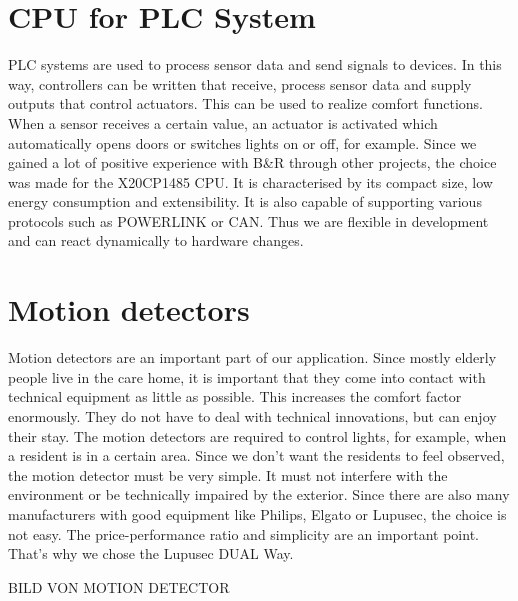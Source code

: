 \section{CPU for PLC System}
PLC systems are used to process sensor data and send signals to devices. In this way, controllers can be written that receive, process sensor data and supply outputs that control actuators. This can be used to realize comfort functions. When a sensor receives a certain value, an actuator is activated which automatically opens doors or switches lights on or off, for example. Since we gained a lot of positive experience with B\&R through other projects, the choice was made for the X20CP1485 CPU. It is characterised by its compact size, low energy consumption and extensibility. It is also capable of supporting various protocols such as POWERLINK or CAN. Thus we are flexible in development and can react dynamically to hardware changes.

\section{Motion detectors}
Motion detectors are an important part of our application. Since mostly elderly people live in the care home, it is important that they come into contact with technical equipment as little as possible. This increases the comfort factor enormously. They do not have to deal with technical innovations, but can enjoy their stay. The motion detectors are required to control lights, for example, when a resident is in a certain area. Since we don't want the residents to feel observed, the motion detector must be very simple. It must not interfere with the environment or be technically impaired by the exterior. Since there are also many manufacturers with good equipment like Philips, Elgato or Lupusec, the choice is not easy. The price-performance ratio and simplicity are an important point. That's why we chose the Lupusec DUAL Way.

BILD VON MOTION DETECTOR

